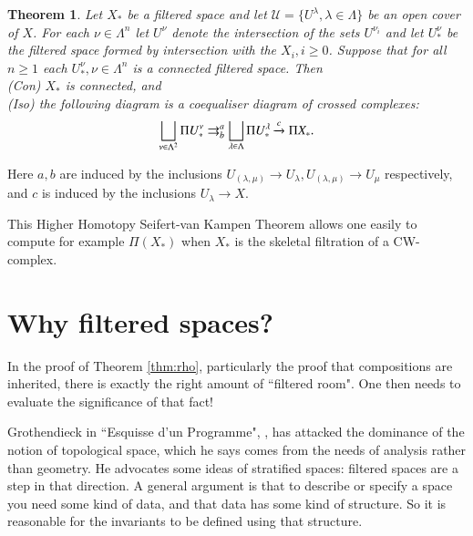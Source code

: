 \documentclass{elsarticle}
\newtheorem{theorem}[example]{Theorem}
{\theorembodyfont{\rmfamily}\newtheorem{rem}[example]{Remark}}
\begin{document}
\begin{theorem}\cite{BH81:col}\label{thm:hhvkt} Let $X_*$ be a filtered space and let $\mathcal U = \{U^\lambda, \lambda \in \Lambda \}$ be an open cover of $X$. For each $\nu \in \Lambda ^n$ let $U^\nu$ denote the intersection of the sets $U^{\nu_i}$ and let $U^\nu _*$ be the filtered space formed by intersection with the $X_i, i \geqslant 0$. Suppose that for all $n \geqslant 1$ each  $U^\nu_*, \nu \in \Lambda ^n$  is a connected filtered space.
Then\\
\emph{(Con)} $X_*$ is connected, and \\
\emph{(Iso)} the following diagram is a coequaliser diagram of crossed complexes:
$$\bigsqcup _{\nu \in \Lambda ^2} \Pi U^\nu _*  \rightrightarrows^a_b \bigsqcup _{\lambda \in \Lambda } \Pi U^\lambda _* \xrightarrow{c}  \Pi X_* .\qed  $$
  \end{theorem}
Here $a,b$ are induced by the inclusions $U_{(\lambda,\mu)} \to U_\lambda, U_{(\lambda,\mu)} \to U_\mu$ respectively, and $c$ is induced   by the inclusions $U_\lambda \to X$.

This Higher Homotopy Seifert-van Kampen Theorem allows one easily to compute for example $\Pi(X_*)$ when $X_*$ is the skeletal filtration of a CW-complex.

\section{Why filtered spaces?}\label{sec:whyfilt}
In the proof of   Theorem \ref{thm:rho}, particularly the proof that compositions are inherited, there
is exactly the right amount of ``filtered room".  One then needs to evaluate the significance of
that fact!

Grothendieck in ``Esquisse d'un Programme", \cite[Section 5]{GrEsq}, has attacked the dominance of the
notion of topological space, which he says comes from the needs of analysis rather than geometry.
He advocates some ideas of stratified spaces: filtered spaces are a step in that direction.
A general argument is that to describe or specify a space you need some kind of data, and
that data has some kind of structure. So it is reasonable for the invariants to be defined using
that structure.
\end{document}
